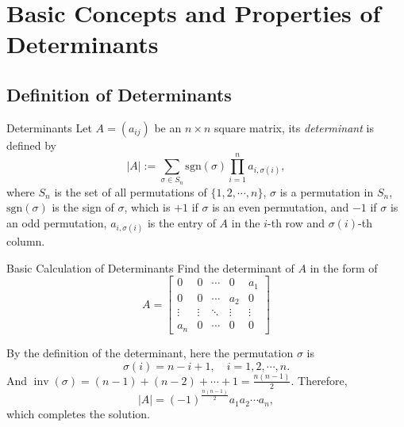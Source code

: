 
\section{Basic Concepts and Properties of Determinants}

\subsection{Definition of Determinants}

\begin{definition}{Determinants}{}
  Let $A = (a_{ij})$ be an $n \times n$ square matrix,
  its \emph{determinant} is defined by
  \begin{equation}
    |A| := \sum\limits_{\sigma \in S_n} \mathrm{sgn}(\sigma) \prod\limits_{i = 1}^n a_{i, \sigma(i)},
  \end{equation}
  where $S_n$ is the set of all permutations of $\{1, 2, \cdots, n\}$,
  $\sigma$ is a permutation in $S_n$,
  $\mathrm{sgn}(\sigma)$ is the sign of $\sigma$,
  which is $+1$ if $\sigma$ is an even permutation,
  and $-1$ if $\sigma$ is an odd permutation,
  $a_{i, \sigma(i)}$ is the entry of $A$ in the $i$-th row and $\sigma(i)$-th column.
\end{definition}

\begin{example}{Basic Calculation of Determinants}{}
  Find the determinant of $A$ in the form of
  \begin{equation}
    A =
    \begin{bmatrix}
      0 & 0 & \cdots & 0 & a_1\\
      0 & 0 & \cdots & a_2 & 0 \\
      \vdots & \vdots & \ddots & \vdots & \vdots \\
      a_n & 0 & \cdots & 0 & 0
    \end{bmatrix}
  \end{equation}
\end{example}

\begin{solution}
  By the definition of the determinant, here the permutation $\sigma$ is
  \begin{equation}
    \sigma(i) = n - i + 1, \quad i = 1,2,\cdots,n.
  \end{equation}
  And $\operatorname{inv}(\sigma) = (n-1) + (n-2) + \cdots + 1 = \frac{n(n-1)}{2}$.
  Therefore,
  \begin{equation}
    |A| = (-1)^{\frac{n(n-1)}{2}} a_1a_2\cdots a_n,
  \end{equation}
  which completes the solution.
\end{solution}

